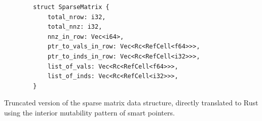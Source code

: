 \begin{listing}[H]
    \begin{verbatim}
        struct SparseMatrix {
            total_nrow: i32,
            total_nnz: i32,
            nnz_in_row: Vec<i64>,
            ptr_to_vals_in_row: Vec<Rc<RefCell<f64>>>,
            ptr_to_inds_in_row: Vec<Rc<RefCell<i32>>>,
            list_of_vals: Vec<Rc<RefCell<f64>>>,
            list_of_inds: Vec<Rc<RefCell<i32>>>,
        }
    \end{verbatim}
    \caption{Truncated version of the sparse matrix data structure, directly translated to Rust using the interior mutability pattern of smart pointers.}
    \label{listing:rust-sparse-matrix-structure}
\end{listing}



